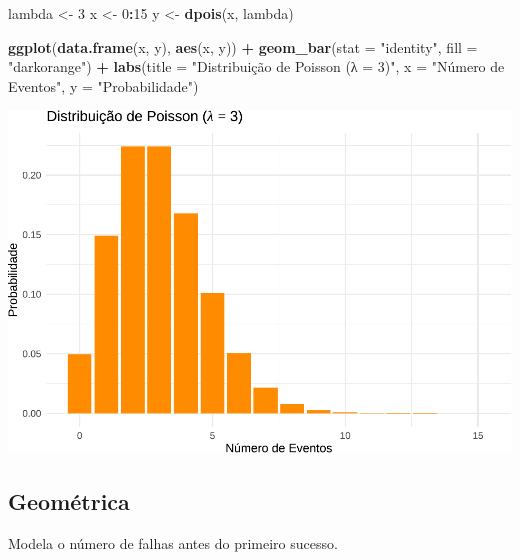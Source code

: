 \documentclass[
]{book}
\newenvironment{Shaded}{\begin{snugshade}}{\end{snugshade}}
\newcommand{\AttributeTok}[1]{\textcolor[rgb]{0.13,0.29,0.53}{#1}}
\newcommand{\DecValTok}[1]{\textcolor[rgb]{0.00,0.00,0.81}{#1}}
\newcommand{\FunctionTok}[1]{\textcolor[rgb]{0.13,0.29,0.53}{\textbf{#1}}}
\newcommand{\NormalTok}[1]{#1}
\newcommand{\OtherTok}[1]{\textcolor[rgb]{0.56,0.35,0.01}{#1}}
\newcommand{\SpecialCharTok}[1]{\textcolor[rgb]{0.81,0.36,0.00}{\textbf{#1}}}
\newcommand{\StringTok}[1]{\textcolor[rgb]{0.31,0.60,0.02}{#1}}
\begin{document}
\begin{Shaded}
\begin{Highlighting}[]
\NormalTok{lambda }\OtherTok{\textless{}{-}} \DecValTok{3}
\NormalTok{x }\OtherTok{\textless{}{-}} \DecValTok{0}\SpecialCharTok{:}\DecValTok{15}
\NormalTok{y }\OtherTok{\textless{}{-}} \FunctionTok{dpois}\NormalTok{(x, lambda)}

\FunctionTok{ggplot}\NormalTok{(}\FunctionTok{data.frame}\NormalTok{(x, y), }\FunctionTok{aes}\NormalTok{(x, y)) }\SpecialCharTok{+}
  \FunctionTok{geom\_bar}\NormalTok{(}\AttributeTok{stat =} \StringTok{"identity"}\NormalTok{, }\AttributeTok{fill =} \StringTok{"darkorange"}\NormalTok{) }\SpecialCharTok{+}
  \FunctionTok{labs}\NormalTok{(}\AttributeTok{title =} \StringTok{"Distribuição de Poisson (λ = 3)"}\NormalTok{, }\AttributeTok{x =} \StringTok{"Número de Eventos"}\NormalTok{, }\AttributeTok{y =} \StringTok{"Probabilidade"}\NormalTok{)}
\end{Highlighting}
\end{Shaded}

\includegraphics{Livro-Estatistica+R_files/figure-latex/poisson-1.pdf}

\subsection{Geométrica}\label{geomuxe9trica}

Modela o número de falhas antes do primeiro sucesso.
\end{document}

